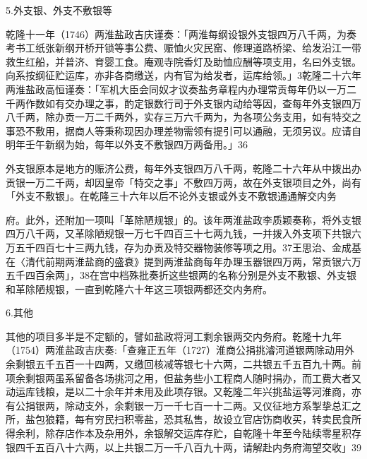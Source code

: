 5.外支银、外支不敷银等

乾隆十一年（1746）两淮盐政吉庆谨奏：「两淮每纲设银外支银四万八千两，为奏考书工纸张新纲开桥开锁等事公费、赈恤火灾民窑、修理道路桥梁、给发沿江一带救生红船，并普济、育婴工食。庵观寺院香灯及助恤应酬等项支用，名曰外支银。向系按纲征贮运库，亦非各商缴送，内有官为给发者，运库给领。」3乾隆二十六年两淮盐政高恒谨奏：「军机大臣会同奴才议奏盐务章程内办理常贡每年仍以一万二千两作数如有交办理之事，酌定银数行司于外支银内动给等因，查每年外支银四万八千两，除办贡一万二千两外，实存三万六千两为，为各项公务支用，如有特交之事恐不敷用，据商人等秉称现因办理差物需领有提引可以通融，无须另议。应请自明年壬午新纲为始，每年以外支不敷银四万两备用。」36

外支银原本是地方的赈济公费，每年外支银四万八千两，乾隆二十六年从中拨出办贡银一万二千两，却因皇帝「特交之事」不敷四万两，故在外支银项目之外，尚有「外支不敷银」。在乾隆三十六年以后不论外支银或外支不敷银通通解交内务

\vfill
\begin{BookNotes}
\end{BookNotes}

\noindent 府。此外，还附加一项叫「革除陋规银」的。该年两淮盐政李质颖奏称，将外支银四万八千两，又革除陋规银一万七千四百三十七两九钱，一并拨入外支项下共银六万五千四百七十三两九钱，存为办贡及特交器物装修等项之用。37王思治、金成基在〈清代前期两淮盐商的盛衰》提到两淮盐商每年办理玉器银四万两，常贡银六万五千四百余两」，38在宫中档殊批奏折这些银两的名称分别是外支不敷银、外支银和革除陋规银，一直到乾隆六十年这三项银两都还交内务府。

6.其他

其他的项目多半是不定额的，譬如盐政将河工剩余银两交内务府。乾隆十九年（1754）两淮盐政吉庆奏:「查雍正五年（1727）淮商公捐挑濬河道银两除动用外余剩银五千五百一十四两，又缴回核减等银七十六两，二共银五千五百九十两。前项余剩银两虽系留备各场挑河之用，但盐务些小工程商人随时捐办，而工费大者又动运库钱粮，是以二十余年并未用及此项存银。又乾隆二年兴挑盐运等河淮商，亦有公捐银两，除动支外，余剩银一万一千七百一十二两。又仪征地方系掣挚总汇之所，盐包狼籍，每有穷民扫积零盐，恐其私售，故设立官店饬商收买，转卖民食所得余利，除存店作本及杂用外，余银解交运库存贮，自乾隆十年至今陆续零星积存银四千五百八十六两，以上共银二万一千八百九十两，请解赴内务府海望交收」39

